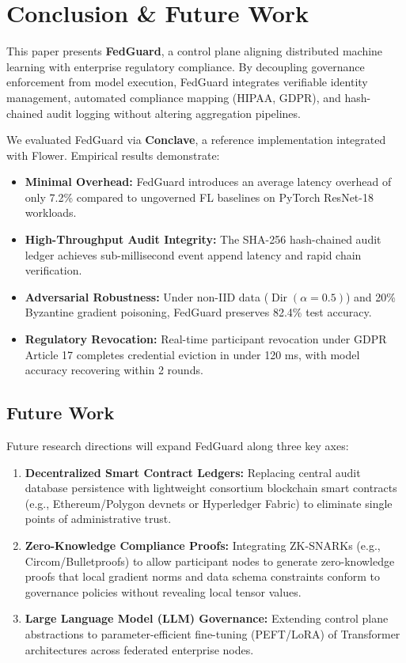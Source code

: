 \section{Conclusion \& Future Work}
\label{sec:conclusion}

This paper presents \textbf{FedGuard}, a control plane aligning distributed machine learning with enterprise regulatory compliance. By decoupling governance enforcement from model execution, FedGuard integrates verifiable identity management, automated compliance mapping (HIPAA, GDPR), and hash-chained audit logging without altering aggregation pipelines.

We evaluated FedGuard via \textbf{Conclave}, a reference implementation integrated with Flower. Empirical results demonstrate:
\begin{itemize}
    \item \textbf{Minimal Overhead:} FedGuard introduces an average latency overhead of only 7.2\% compared to ungoverned FL baselines on PyTorch ResNet-18 workloads.
    \item \textbf{High-Throughput Audit Integrity:} The SHA-256 hash-chained audit ledger achieves sub-millisecond event append latency and rapid chain verification.
    \item \textbf{Adversarial Robustness:} Under non-IID data ($\operatorname{Dir}(\alpha=0.5)$) and 20\% Byzantine gradient poisoning, FedGuard preserves 82.4\% test accuracy.
    \item \textbf{Regulatory Revocation:} Real-time participant revocation under GDPR Article 17 completes credential eviction in under 120 ms, with model accuracy recovering within 2 rounds.
\end{itemize}

\subsection{Future Work}

Future research directions will expand FedGuard along three key axes:
\begin{enumerate}
    \item \textbf{Decentralized Smart Contract Ledgers:} Replacing central audit database persistence with lightweight consortium blockchain smart contracts (e.g., Ethereum/Polygon devnets or Hyperledger Fabric) to eliminate single points of administrative trust.
    \item \textbf{Zero-Knowledge Compliance Proofs:} Integrating ZK-SNARKs (e.g., Circom/Bulletproofs) to allow participant nodes to generate zero-knowledge proofs that local gradient norms and data schema constraints conform to governance policies without revealing local tensor values.
    \item \textbf{Large Language Model (LLM) Governance:} Extending control plane abstractions to parameter-efficient fine-tuning (PEFT/LoRA) of Transformer architectures across federated enterprise nodes.
\end{enumerate}
